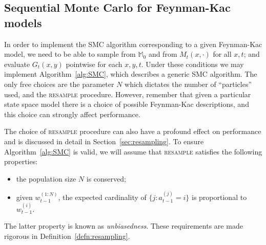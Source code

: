 \subsection{Sequential Monte Carlo for Feynman-Kac models}
\label{sec:SMC_FK}
In order to implement the SMC algorithm corresponding to a given Feynman-Kac model, we need to be able to sample from $\mathbb{M}_0$ and from $M_t(x, \cdot)$ for all $x,t$; and evaluate $G_t(x, y)$ pointwise for each $x,y, t$.
Under these conditions we may implement Algorithm~\ref{alg:SMC}, which describes a generic SMC algorithm. 
The only free choices are the parameter $N$ which dictates the number of ``particles'' used, and the \textsc{resample} procedure.
However, remember that given a particular state space model there is a choice of possible Feynman-Kac descriptions, and this choice can strongly affect performance.

The choice of \textsc{resample} procedure can also have a profound effect on performance and is discussed in detail in Section~\ref{sec:resampling}. To ensure Algorithm~\ref{alg:SMC} is valid, we will assume that \textsc{resample} satisfies the following properties:
\begin{itemize}
\item the population size $N$ is conserved;
\item given $w_{t-1}^{(1:N)}$, the expected cardinality of $\{j: a_{t-1}^{(j)} = i\}$ is proportional to $w_{t-1}^{(i)}$.
\end{itemize}
The latter property is known as \emph{unbiasedness}.
These requirements are made rigorous in Definition~\ref{defn:resampling}.

